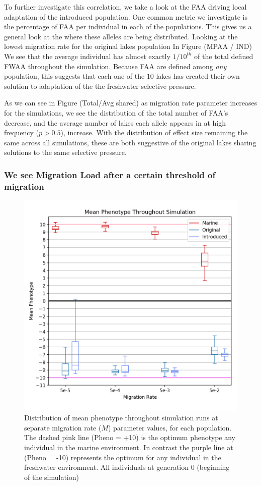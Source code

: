 \documentclass{article}
\begin{document}
To further investigate this correlation, we take a look at the FAA driving 
local adaptation of the introduced population. 
One common metric we investigate is the percentage of FAA per individual in each of the populations. 
This gives us a general look at the where these alleles are being distributed. 
Looking at the lowest migration rate for the original lakes population In Figure (MPAA / IND) 
We see that the average individual has almost exactly $1/10^{th}$ of the total defined FWAA throughout the simulation. 
Because FAA are defined among \textit{any} population, this suggests that each one of the $10$ 
lakes has created their own solution to adaptation of the the freshwater selective pressure. 

As we can see in Figure (Total/Avg shared)
as migration rate parameter increases for the simulations, 
we see the distribution of the total number of FAA's decrease, and 
the average number of lakes each allele appears in at high frequency ($p > 0.5$), increase.
With the distribution of effect size remaining the same across all simulations, 
these are both suggestive of the original lakes sharing solutions to the same selective pressure.



\subsubsection*{We see Migration Load after a certain threshold of migration}

\begin{figure}[h!tb]
	\begin{center}
  		\includegraphics[width=0.6\linewidth]{matplotlibPlots/MeanPhenotype1.png}
  		\caption{Distribution of mean phenotype throughout simulation runs at separate migration rate ($M$) parameter values, for each population.
		The dashed pink line (Pheno = +10) is the optimum phenotype any individual in the marine environment.
		In contrast the purple line at (Pheno = -10) represents the optimum for any individual in the freshwater environment. 
		All individuals at generation 0 (beginning of the simulation) 
		}
  		\label{fig:MeanPhenotype}
	\end{center}
\end{figure}
\end{document}
